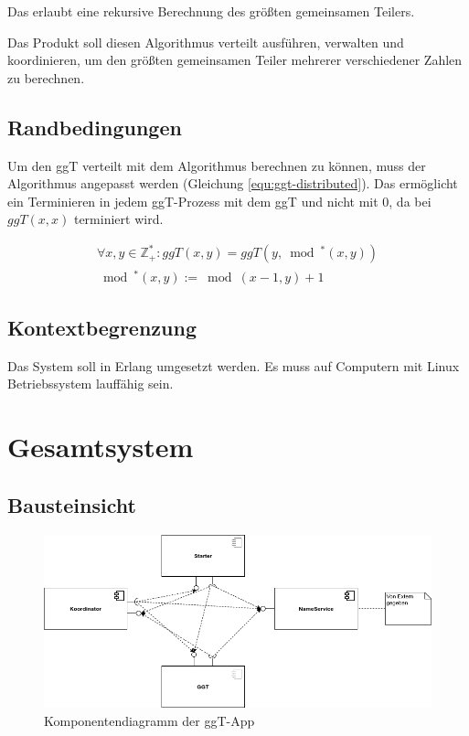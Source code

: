 \documentclass{article}
\begin{document}
Das erlaubt eine rekursive Berechnung des größten gemeinsamen Teilers.

Das Produkt soll diesen Algorithmus verteilt ausführen, verwalten und koordinieren, um den größten gemeinsamen Teiler
mehrerer verschiedener Zahlen zu berechnen.

\subsection{Randbedingungen}
Um den ggT verteilt mit dem Algorithmus berechnen zu können, muss der Algorithmus angepasst werden
(Gleichung \ref{equ:ggt-distributed}). Das ermöglicht ein Terminieren in jedem ggT-Prozess mit dem ggT und nicht mit 0,
da bei $ggT(x,x)$ terminiert wird.

\begin{multline}
\forall x,y \in \mathbb{Z}^{*}_{+}: ggT(x,y) = ggT(y,\bmod{^{*}(x,y)})\\
\bmod{^{*}(x,y)} := \bmod{(x-1, y)} + 1
\label{equ:ggt-distributed}
\end{multline}

\subsection{Kontextbegrenzung}
Das System soll in Erlang umgesetzt werden. Es muss auf Computern mit Linux Betriebssystem lauffähig sein.

\newpage

\section{Gesamtsystem}

\subsection{Bausteinsicht}
\begin{figure}[H]
    \centering
    \includegraphics[width=1.0\textwidth]{component-diagram.png}
    \caption[seq-dia]{Komponentendiagramm der ggT-App}
    \label{fig:component-diagram}
\end{figure}
\end{document}
